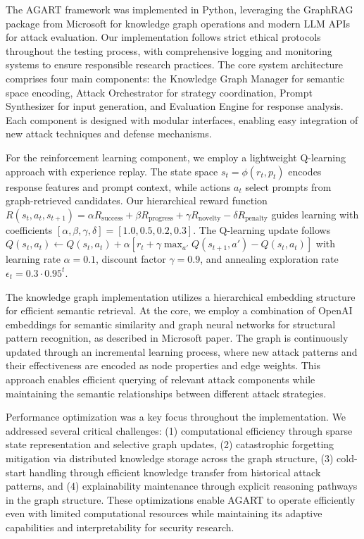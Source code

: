 The AGART framework was implemented in Python, leveraging the GraphRAG package from Microsoft\cite{GraphRAG} for knowledge graph operations and modern LLM APIs for attack evaluation. Our implementation follows strict ethical protocols throughout the testing process, with comprehensive logging and monitoring systems to ensure responsible research practices. The core system architecture comprises four main components: the Knowledge Graph Manager for semantic space encoding, Attack Orchestrator for strategy coordination, Prompt Synthesizer for input generation, and Evaluation Engine for response analysis. Each component is designed with modular interfaces, enabling easy integration of new attack techniques and defense mechanisms.

For the reinforcement learning component, we employ a lightweight Q-learning approach with experience replay. The state space $s_t = \phi(r_t, p_t)$ encodes response features and prompt context, while actions $a_t$ select prompts from graph-retrieved candidates. Our hierarchical reward function $R(s_t, a_t, s_{t+1}) = \alpha R_{\text{success}} + \beta R_{\text{progress}} + \gamma R_{\text{novelty}} - \delta R_{\text{penalty}}$ guides learning with coefficients $[\alpha, \beta, \gamma, \delta] = [1.0, 0.5, 0.2, 0.3]$. The Q-learning update follows $Q(s_t, a_t) \leftarrow Q(s_t, a_t) + \alpha[r_t + \gamma \max_{a'} Q(s_{t+1}, a') - Q(s_t, a_t)]$ with learning rate $\alpha = 0.1$, discount factor $\gamma = 0.9$, and annealing exploration rate $\epsilon_t = 0.3 \cdot 0.95^t$.

The knowledge graph implementation utilizes a hierarchical embedding structure for efficient semantic retrieval. At the core, we employ a combination of OpenAI embeddings for semantic similarity and graph neural networks for structural pattern recognition, as described in Microsoft paper. The graph is continuously updated through an incremental learning process, where new attack patterns and their effectiveness are encoded as node properties and edge weights. This approach enables efficient querying of relevant attack components while maintaining the semantic relationships between different attack strategies.

Performance optimization was a key focus throughout the implementation. We addressed several critical challenges: (1) computational efficiency through sparse state representation and selective graph updates, (2) catastrophic forgetting mitigation via distributed knowledge storage across the graph structure, (3) cold-start handling through efficient knowledge transfer from historical attack patterns, and (4) explainability maintenance through explicit reasoning pathways in the graph structure. These optimizations enable AGART to operate efficiently even with limited computational resources while maintaining its adaptive capabilities and interpretability for security research.
